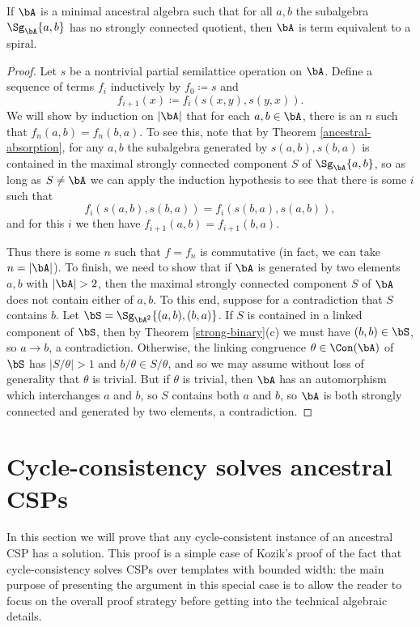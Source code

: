 \begin{thm} If $\bA$ is a minimal ancestral algebra such that for all $a,b$ the subalgebra $\Sg_{\bA}\{a,b\}$ has no strongly connected quotient, then $\bA$ is term equivalent to a spiral.
\end{thm}
\begin{proof} Let $s$ be a nontrivial partial semilattice operation on $\bA$. Define a sequence of terms $f_i$ inductively by $f_0 \coloneqq s$ and
\[
f_{i+1}(x) \coloneqq f_i(s(x,y),s(y,x)).
\]
We will show by induction on $|\bA|$ that for each $a,b \in \bA$, there is an $n$ such that $f_n(a,b) = f_n(b,a)$. To see this, note that by Theorem \ref{ancestral-absorption}, for any $a,b$ the subalgebra generated by $s(a,b), s(b,a)$ is contained in the maximal strongly connected component $S$ of $\Sg_\bA\{a,b\}$, so as long as $S \ne \bA$ we can apply the induction hypothesis to see that there is some $i$ such that
\[
f_i(s(a,b),s(b,a)) = f_i(s(b,a),s(a,b)),
\]
and for this $i$ we then have $f_{i+1}(a,b) = f_{i+1}(b,a)$.

Thus there is some $n$ such that $f = f_n$ is commutative (in fact, we can take $n = |\bA|$). To finish, we need to show that if $\bA$ is generated by two elements $a,b$ with $|\bA| > 2$, then the maximal strongly connected component $S$ of $\bA$ does not contain either of $a,b$. To this end, suppose for a contradiction that $S$ contains $b$. Let $\bS = \Sg_{\bA^2}\{(a,b),(b,a)\}$. If $S$ is contained in a linked component of $\bS$, then by Theorem \ref{strong-binary}(c) we must have $(b,b) \in \bS$, so $a \rightarrow b$, a contradiction. Otherwise, the linking congruence $\theta \in \Con(\bA)$ of $\bS$ has $|S/\theta| > 1$ and $b/\theta \in S/\theta$, and so we may assume without loss of generality that $\theta$ is trivial. But if $\theta$ is trivial, then $\bA$ has an automorphism which interchanges $a$ and $b$, so $S$ contains both $a$ and $b$, so $\bA$ is both strongly connected and generated by two elements, a contradiction.
\end{proof}


\section{Cycle-consistency solves ancestral CSPs}

In this section we will prove that any cycle-consistent instance of an ancestral CSP has a solution. This proof is a simple case of Kozik's proof \cite{slac} of the fact that cycle-consistency solves CSPs over templates with bounded width: the main purpose of presenting the argument in this special case is to allow the reader to focus on the overall proof strategy before getting into the technical algebraic details.

